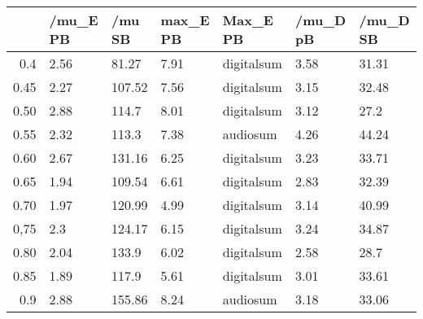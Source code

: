 \begin{table}[ht]
\centering
\begin{tabular}{rllllll}
  \hline
 & /mu\_E PB & /mu SB & max\_E PB & Max\_E PB & /mu\_D pB & /mu\_D SB \\ 
  \hline
0.4 & 2.56 & 81.27 & 7.91 & digitalsum & 3.58 & 31.31 \\ 
  0.45 & 2.27 & 107.52 & 7.56 & digitalsum & 3.15 & 32.48 \\ 
  0.50 & 2.88 & 114.7 & 8.01 & digitalsum & 3.12 & 27.2 \\ 
  0.55 & 2.32 & 113.3 & 7.38 & audiosum & 4.26 & 44.24 \\ 
  0.60 & 2.67 & 131.16 & 6.25 & digitalsum & 3.23 & 33.71 \\ 
  0.65 & 1.94 & 109.54 & 6.61 & digitalsum & 2.83 & 32.39 \\ 
  0.70 & 1.97 & 120.99 & 4.99 & digitalsum & 3.14 & 40.99 \\ 
  0,75 & 2.3 & 124.17 & 6.15 & digitalsum & 3.24 & 34.87 \\ 
  0.80 & 2.04 & 133.9 & 6.02 & digitalsum & 2.58 & 28.7 \\ 
  0.85 & 1.89 & 117.9 & 5.61 & digitalsum & 3.01 & 33.61 \\ 
  0.9 & 2.88 & 155.86 & 8.24 & audiosum & 3.18 & 33.06 \\ 
   \hline
\end{tabular}
\end{table}
